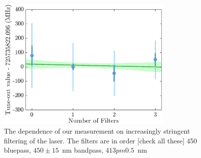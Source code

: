 \documentclass[aps,prl,
,reprint,
superscriptaddress,
onecolumn,
showpacs,preprintnumbers,
 amsmath,amssymb,
]{revtex4-1}
\begin{document}
\begin{figure}[h!]
\centering
\includegraphics[width=8.6cm]{figs/filt_dep.eps}
\caption{ The dependence of our measurement on increasingly stringent filtering of the laser. The filters are in order [check all these] 450 bluepass, $450\pm15$~nm bandpass, $413pm0.5$~nm
}
\end{figure}






\end{document}
